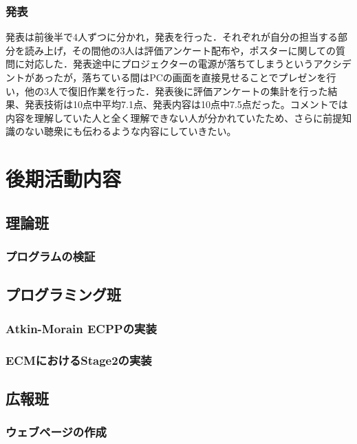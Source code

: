 \documentclass[openany,11pt,papersize]{jsbook}
\begin{document}

\subsection{発表}
発表は前後半で4人ずつに分かれ，発表を行った．それぞれが自分の担当する部分を読み上げ，その間他の3人は評価アンケート配布や，ポスターに関しての質問に対応した．発表途中にプロジェクターの電源が落ちてしまうというアクシデントがあったが，落ちている間はPCの画面を直接見せることでプレゼンを行い，他の3人で復旧作業を行った．発表後に評価アンケートの集計を行った結果、発表技術は10点中平均7.1点、発表内容は10点中7.5点だった。コメントでは内容を理解していた人と全く理解できない人が分かれていたため、さらに前提知識のない聴衆にも伝わるような内容にしていきたい。


\chapter{後期活動内容}

\section{理論班}

\subsection{プログラムの検証}

\section{プログラミング班}

\subsection{Atkin-Morain ECPPの実装}

\subsection{ECMにおけるStage2の実装}

\section{広報班}

\subsection{ウェブページの作成}
\end{document}

